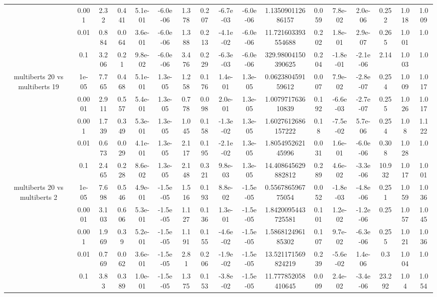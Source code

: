 \begin{tabular}{|c|c|c|c|c|c|c|c|c|c|c|c|c|c|c|c|c|}
 & 0.001 & 2.32 & 0.441 & 5.1e-01 & -6.0e-06 & 1.378 & 0.207 & -6.7e-03 & -6.0e-06 & 1.135090112686157 & 0.059 & 7.8e-02 & 2.0e-06 & 0.252 & 1.018 & 1.009 \\
 & 0.01 & 0.884 & 0.064 & 3.6e-01 & -6.0e-06 & 1.388 & 0.213 & -4.1e-02 & -6.0e-06 & 11.721603393554688 & 0.202 & 1.8e-01 & 2.9e-07 & 0.265 & 1.001 & 1.0 \\
 & 0.1 & 3.206 & 0.21 & 9.8e-02 & -6.0e-06 & 3.476 & 0.229 & -6.3e-03 & -6.0e-06 & 329.98004150390625 & 0.204 & -1.8e-01 & -2.1e-06 & 2.14 & 1.003 & 1.0 \\
\hline
\multirow{5}{*}{multiberts 20 vs multiberts 19} & 1e-05 & 7.765 & 0.468 & 5.1e-01 & 1.3e-05 & 1.258 & 0.176 & 1.4e-01 & 1.3e-05 & 0.062380459159612 & 0.007 & 7.9e-02 & -2.8e-07 & 0.254 & 1.009 & 1.017 \\
 & 0.0001 & 2.911 & 0.557 & 5.4e-01 & 1.3e-05 & 0.778 & 0.098 & 2.0e-01 & 1.3e-05 & 1.007971763610839 & 0.192 & -6.6e-03 & -2.7e-07 & 0.255 & 1.026 & 1.017 \\
 & 0.001 & 1.739 & 0.349 & 5.3e-01 & 1.3e-05 & 1.045 & 0.158 & -1.3e-02 & 1.3e-05 & 1.6027612686157222 & 0.18 & -7.5e-02 & 5.7e-06 & 0.254 & 1.08 & 1.122 \\
 & 0.01 & 0.673 & 0.029 & 4.1e-01 & 1.3e-05 & 2.117 & 0.195 & -2.1e-02 & 1.3e-05 & 1.805495262145996 & 0.031 & 1.6e-01 & -6.0e-06 & 0.308 & 1.028 & 1.0 \\
 & 0.1 & 2.465 & 0.228 & 8.6e-02 & 1.3e-05 & 2.148 & 0.321 & 9.8e-03 & 1.3e-05 & 14.408645629882812 & 0.289 & 4.6e-02 & -3.3e-06 & 10.932 & 1.017 & 1.001 \\
\hline
\multirow{5}{*}{multiberts 20 vs multiberts 2} & 1e-05 & 7.698 & 0.546 & 4.9e-01 & -1.5e-05 & 1.516 & 0.193 & 8.8e-02 & -1.5e-05 & 0.556786596775054 & 0.052 & -1.8e-03 & -4.8e-06 & 0.251 & 1.059 & 1.036 \\
 & 0.0001 & 3.103 & 0.606 & 5.3e-01 & -1.5e-05 & 1.127 & 0.136 & 1.3e-01 & -1.5e-05 & 1.8420095443725581 & 0.101 & 1.2e-02 & -1.2e-06 & 0.25 & 1.057 & 1.045 \\
 & 0.001 & 1.969 & 0.39 & 5.2e-01 & -1.5e-05 & 1.191 & 0.155 & -4.6e-02 & -1.5e-05 & 1.586812496185302 & 0.107 & 9.7e-02 & -6.3e-06 & 0.255 & 1.021 & 1.036 \\
 & 0.01 & 0.769 & 0.062 & 3.6e-01 & -1.5e-05 & 2.81 & 0.206 & -1.9e-02 & -1.5e-05 & 13.521171569824219 & 0.239 & -5.6e-02 & 1.4e-06 & 0.3 & 1.004 & 1.0 \\
 & 0.1 & 3.83 & 0.389 & 1.0e-01 & -1.5e-05 & 1.375 & 0.153 & -3.8e-02 & -1.5e-05 & 11.777852058410645 & 0.009 & 2.4e-02 & -3.4e-06 & 23.292 & 1.04 & 1.054 \\

\end{tabular}
